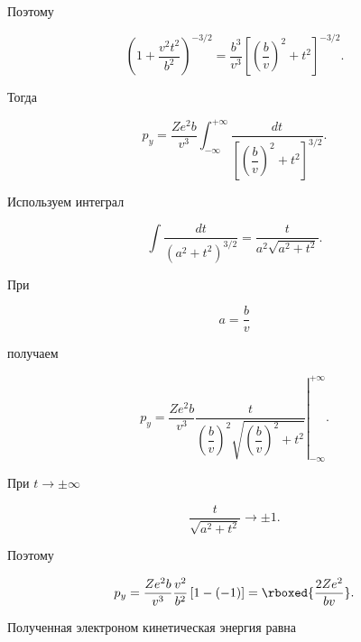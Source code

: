 \documentclass[../final.tex]{subfiles}
\begin{document}
Поэтому

\begin{equation*}
    \left(
        1+
        \frac{v^2t^2}{b^2}
    \right)^{-3/2}
    =
    \frac{b^3}{v^3}
    \left[
        \left(
            \frac{b}{v}
        \right)^2
        +
        t^2
    \right]^{-3/2}.
\end{equation*}

Тогда

\begin{equation*}
    p_y
    =
    \frac{Ze^2b}{v^3}
    \int_{-\infty}^{+\infty}
    \frac{dt}{
        \left[
            \left(
                \dfrac{b}{v}
            \right)^2
            +
            t^2
        \right]^{3/2}
    }.
\end{equation*}

Используем интеграл

\begin{equation*}
    \int
    \frac{dt}{
        \left(
            a^2+t^2
        \right)^{3/2}
    }
    =
    \frac{t}{
        a^2
        \sqrt{
            a^2+t^2
        }
    }.
\end{equation*}

При

\begin{equation*}
    a
    =
    \frac{b}{v}
\end{equation*}

получаем

\begin{equation*}
    p_y
    =
    \frac{Ze^2b}{v^3}
    \left.
    \frac{t}{
        \left(
            \dfrac{b}{v}
        \right)^2
        \sqrt{
            \left(
                \dfrac{b}{v}
            \right)^2+t^2
        }
    }
    \right|_{-\infty}^{+\infty}.
\end{equation*}

При $t\rightarrow\pm\infty$

\begin{equation*}
    \frac{t}{
        \sqrt{
            a^2+t^2
        }
    }
    \longrightarrow
    \pm1.
\end{equation*}

Поэтому

\begin{equation*}
    p_y
    =
    \frac{Ze^2b}{v^3}
    \frac{v^2}{b^2}
    \left[
        1-(-1)
    \right]
    =
    \rboxed{
        \frac{2Ze^2}{bv}
    }.
\end{equation*}

Полученная электроном кинетическая энергия равна
\end{document}

